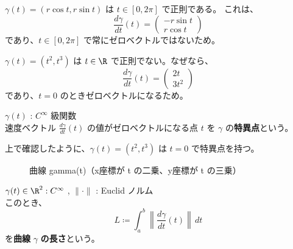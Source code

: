 \documentclass[article,paper=a4paper]{jlreq}
\begin{document}
\begin{ex}
    \quad $\gamma(t) = (r\cos t, r\sin t)$ は $t \in [0, 2\pi]$ で正則である。
    これは、
    \[
    \frac{d\gamma}{dt}(t) = \begin{pmatrix}
-r\sin t \\ r\cos t
    \end{pmatrix}
    \]
    であり、$t \in [0, 2\pi]$ で常にゼロベクトルではないため。
\end{ex}

\begin{ex}
    \quad $\gamma(t) = (t^2, t^3)$ は $t \in \R$ で正則でない。なぜなら、
    \[
    \frac{d\gamma}{dt}(t) = \begin{pmatrix}
2t \\ 3t^2
    \end{pmatrix}
    \]
    であり、$t=0$ のときゼロベクトルになるため。
\end{ex}

\begin{dfn}
    \quad $\gamma(t)$ : $C^{\infty}$ 級関数\\
    速度ベクトル $\frac{d\gamma}{dt}(t)$ の値がゼロベクトルになる点 $t$ を $\gamma$ の\textbf{特異点}という。
\end{dfn}

\begin{ex}
    \quad 上で確認したように、$\gamma(t) = (t^2, t^3)$ は $t=0$ で特異点を持つ。
\end{ex}

\begin{figure}[htbp]
\centering
{}
\caption{曲線 gamma(t)（x座標が t の二乗、y座標が t の三乗）}
\label{fig:gamma-t2-t3}
\end{figure}

\begin{dfn}
    \quad $\gamma(t) \in \R^2 : C^{\infty}$ , $\|\cdot\|$ : Euclid ノルム \\
    このとき、
    \[L \coloneq \int_a^b \left\|\frac{d\gamma}{dt}(t)\right\| \,dt\]     
    を\textbf{曲線} $\gamma$ \textbf{の長さ}という。
\end{dfn}
\end{document}
